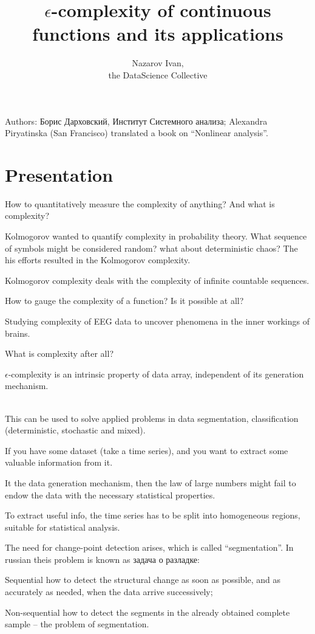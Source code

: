 \documentclass[a4paper]{article}
\title{$\epsilon$-complexity of continuous functions and its applications}
\author{Nazarov Ivan, \rus{101мНОД(ИССА)}\\the DataScience Collective}
\newcommand{\rus}[1]{\foreignlanguage{russian}{#1}}
\begin{document}
\maketitle

Authors: \rus{Борис Дарховский, Институт Системного анализа}; Alexandra Piryatinska (San Francisco)
translated a book on ``Nonlinear analysis''.

\section{Presentation} %
\label{sec:presentation}

How to quantitatively measure the complexity of anything? And what is complexity?

Kolmogorov wanted to quantify complexity in probability theory.
What sequence of symbols might be considered random? what about deterministic chaos?
The his efforts resulted in the Kolmogorov complexity.

Kolmogorov complexity deals with the complexity of infinite countable sequences.

How to gauge the complexity of a function? Is it possible at all?

Studying complexity of EEG data to uncover phenomena in the inner workings of brains.

What is complexity after all?


$\epsilon$-complexity is an intrinsic property of data array, independent of its generation mechanism.


\Nonlinear {}\hfill\\

This can be used to solve applied problems in data segmentation, classification (deterministic, stochastic and mixed).

If you have some dataset (take a time series), and you want to extract some valuable information from it.

It the data generation mechanism, then the law of large numbers might fail to endow the data with the necessary statistical properties.

To extract useful info, the time series has to be split into homogeneous regions, suitable for statistical analysis.

The need for change-point detection arises, which is called ``segmentation''. In russian theis problem is known as \rus{задача о разладке}: \begin{dscription}
	\item[Sequential] how to detect the structural change as soon as possible, and as accurately as needed, when the data arrive successively;
	\item[Non-sequential] how to detect the segments in the already obtained complete sample -- the problem of segmentation.
\end{dscription}
\end{document}
